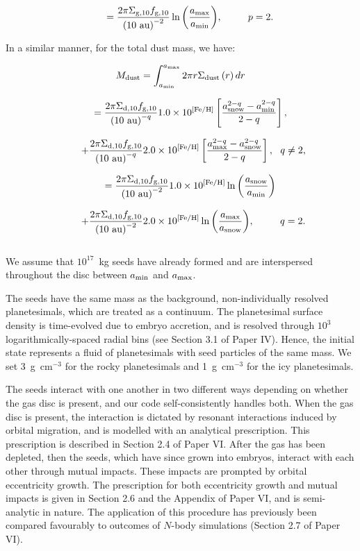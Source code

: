 \documentclass[useAMS,usenatbib]{mn2e}
\newcommand{\rev}{ }
\begin{document}
\begin{equation}
\ \ \ \ \ \  
= \frac{2 \pi \Sigma_{\rm g,10}f_{\rm g,10}}{\left(10 \ {\rm au} \right)^{-2}}
\ln{\left( \frac{a_{\rm max}}{a_{\rm min}} \right)}, 
\ \ \ \ \ \ \ \ p = 2.
\label{Mdisc}
\end{equation}


\noindent{}In a similar manner, for the total dust mass, we have:

\[
M_{\rm dust} = \int_{a_{\rm min}}^{a_{\rm max}} 2\pi r \Sigma_{\rm dust}\left(r\right)dr
\]

\[
\ \ \ \ \ \ 
=\frac{2 \pi \Sigma_{\rm d,10}f_{\rm g,10}}{\left(10 \ {\rm au} \right)^{-q}}
1.0\times 10^{\left[{\rm Fe/H}\right]}
\left[
\frac{a_{\rm snow}^{2-q} - a_{\rm min}^{2-q}}{2-q}\right], 
\]

\[
\ \ \ \ \ \ \ \
+\frac{2 \pi \Sigma_{\rm d,10}f_{\rm g,10}}{\left(10 \ {\rm au} \right)^{-q}}
2.0\times 10^{\left[{\rm Fe/H}\right]}
\left[
\frac{a_{\rm max}^{2-q} - a_{\rm snow}^{2-q}}{2-q}\right], 
\ \ q \ne 2,
\]

\[
\ \ \ \ \ \  
= \frac{2 \pi \Sigma_{\rm d,10}f_{\rm g,10}}{\left(10 \ {\rm au} \right)^{-2}}
1.0 \times 10^{\left[{\rm Fe/H}\right]}
\ln{\left( \frac{a_{\rm snow}}{a_{\rm min}} \right)}
\]

\[
\ \ \ \ \ \ \ \
+ \frac{2 \pi \Sigma_{\rm d,10}f_{\rm g,10}}{\left(10 \ {\rm au} \right)^{-2}}
2.0 \times 10^{\left[{\rm Fe/H}\right]}
\ln{\left( \frac{a_{\rm max}}{a_{\rm snow}} \right)}, 
\ \ \ \ \ \ \ \  q = 2.
\]


\begin{equation}
\label{Mdust}
\end{equation}


We assume that $10^{17}$~kg seeds have already formed and are interspersed throughout the disc between $a_{\rm min}$ and $a_{\rm max}$. {\rev The seeds have the same mass as the background, non-individually resolved planetesimals, which are treated as a continuum. The planetesimal surface density is time-evolved due to embryo accretion, and is resolved through $10^3$ logarithmically-spaced radial bins (see Section 3.1 of Paper IV). Hence, the initial state represents a fluid of planetesimals with seed particles of the same mass. We set 3~g~cm$^{-3}$ for the rocky planetesimals and 1~g~cm$^{-3}$ for the icy planetesimals.  

The seeds interact with one another in two different ways depending on whether the gas disc is present, and our code self-consistently handles both. When the gas disc is present, the interaction is dictated by resonant interactions induced by orbital migration, and is modelled with an analytical prescription. This prescription is described in Section 2.4 of Paper VI. After the gas has been depleted, then the seeds, which have since grown into embryos, interact with each other through mutual impacts. These impacts are prompted by orbital eccentricity growth. The prescription for both eccentricity growth and mutual impacts is given in Section 2.6 and the Appendix of Paper VI, and is semi-analytic in nature. The application of this procedure has previously been compared favourably to outcomes of $N$-body simulations (Section 2.7 of Paper VI).
}
\end{document}
